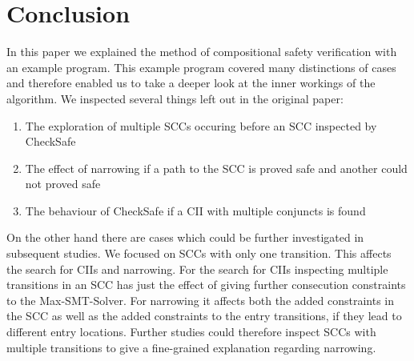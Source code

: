 \section{Conclusion}
\label{sec:conclusion}

In this paper we explained the method of compositional safety verification with an example program.
This example program covered many distinctions of cases and therefore enabled us to take a deeper look at the inner workings of the algorithm.
We inspected several things left out in the original paper:
\begin{enumerate}
\item The exploration of multiple SCCs occuring before an SCC inspected by CheckSafe
\item The effect of narrowing if a path to the SCC is proved safe and another could not proved safe
\item The behaviour of CheckSafe if a CII with multiple conjuncts is found
\end{enumerate}

On the other hand there are cases which could be further investigated in subsequent studies.
We focused on SCCs with only one transition.
This affects the search for CIIs and narrowing.
For the search for CIIs inspecting multiple transitions in an SCC has just the effect of giving further consecution constraints to the Max-SMT-Solver.
For narrowing it affects both the added constraints in the SCC as well as the added constraints to the entry transitions, if they lead to different entry locations.
Further studies could therefore inspect SCCs with multiple transitions to give a fine-grained explanation regarding narrowing.
